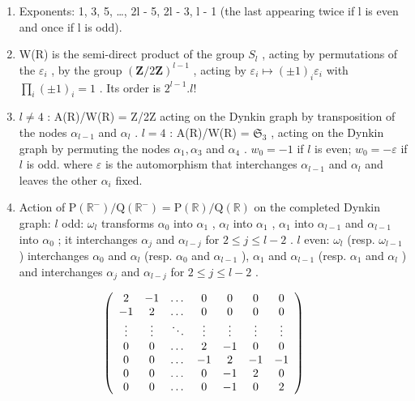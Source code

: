 \begin{enumerate}
\def\labelenumi{(\Roman{enumi})}
\setcounter{enumi}{8}
\item
  Exponents: 1, 3, 5, \ldots, 2l - 5, 2l - 3, l - 1 (the last appearing twice if l is even and once if l is odd).
\item
  W(R) is the semi-direct product of the group \(S_{l}\) , acting by permutations of the \(\varepsilon_{i}\) , by the group \((\mathbf{Z}/2\mathbf{Z})^{l-1}\) , acting by \(\varepsilon_{i} \mapsto (\pm1)_{i}\varepsilon_{i}\) with \(\prod_{i}(\pm1)_{i} = 1\) . Its order is \(2^{l-1}.l!\)
\item
  \(l \neq 4\) : A(R)/W(R) = Z/2Z acting on the Dynkin graph by transposition of the nodes \(\alpha_{l-1}\) and \(\alpha_l\) . \(l = 4\) : A(R)/W(R) = \(\mathfrak{S}_3\) , acting on the Dynkin graph by permuting the nodes \(\alpha_1, \alpha_3\) and \(\alpha_4\) . \(w_0 = -1\) if \(l\) is even; \(w_0 = -\varepsilon\) if \(l\) is odd. where \(\varepsilon\) is the automorphism that interchanges \(\alpha_{l-1}\) and \(\alpha_l\) and leaves the other \(\alpha_i\) fixed.
\item
  Action of \(\mathrm{P}(\mathbb{R}^{-}) / \mathrm{Q}(\mathbb{R}^{-}) = \mathrm{P}(\mathbb{R}) / \mathrm{Q}(\mathbb{R})\) on the completed Dynkin graph: \(l\) odd: \(\omega_l\) transforms \(\alpha_0\) into \(\alpha_1\) , \(\alpha_l\) into \(\alpha_1\) , \(\alpha_1\) into \(\alpha_{l-1}\) and \(\alpha_{l-1}\) into \(\alpha_0\) ; it interchanges \(\alpha_j\) and \(\alpha_{l-j}\) for \(2 \leqslant j \leqslant l - 2\) . \(l\) even: \(\omega_l\) (resp. \(\omega_{l-1}\) ) interchanges \(\alpha_0\) and \(\alpha_l\) (resp. \(\alpha_0\) and \(\alpha_{l-1}\) ), \(\alpha_1\) and \(\alpha_{l-1}\) (resp. \(\alpha_1\) and \(\alpha_l\) ) and interchanges \(\alpha_j\) and \(\alpha_{l-j}\) for \(2 \leqslant j \leqslant l - 2\) .
\end{enumerate}

\[
\left( \begin{array}{c c c c c c c} 2 & - 1 & \dots & 0 & 0 & 0 & 0 \\ - 1 & 2 & \dots & 0 & 0 & 0 & 0 \\ \vdots & \vdots & \ddots & \vdots & \vdots & \vdots & \vdots \\ 0 & 0 & \dots & 2 & - 1 & 0 & 0 \\ 0 & 0 & \dots & - 1 & 2 & - 1 & - 1 \\ 0 & 0 & \dots & 0 & - 1 & 2 & 0 \\ 0 & 0 & \dots & 0 & - 1 & 0 & 2 \end{array} \right)
\]

